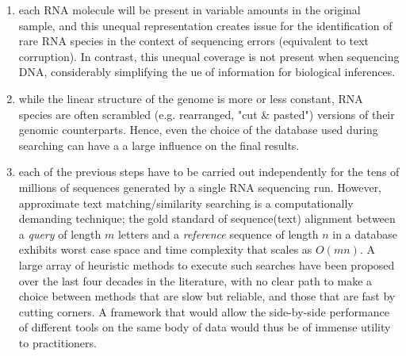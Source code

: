 \documentclass[10pt]{article}
\begin{document}
\begin{enumerate}
\item each RNA molecule will be present in variable amounts in the original sample, and this unequal representation creates issue for the identification of rare RNA species in the context of sequencing errors (equivalent to text corruption). In contrast, this unequal coverage is not present when sequencing DNA, considerably simplifying the ue of information for biological inferences. 
\item while the linear structure of the genome is more or less constant, RNA species are often scrambled (e.g. rearranged, "cut \& pasted") versions of their genomic counterparts. Hence, even the choice of the database used during searching can have a a large influence on the final results.
\item each of the previous steps have to be carried out independently for the tens of millions of sequences generated by a single RNA sequencing run. However, approximate text matching/similarity searching is a computationally demanding technique; the gold standard of sequence(text) alignment between a \textit{query} of length $m$ letters and a \textit{reference} sequence of length $n$ in a database exhibits worst case space and time complexity that scales as $O(mn)$. A large array of heuristic methods to execute such searches have been proposed over the last four decades in the literature\cite{song_new_2014,sahlin_effective_2021,bucher_sequence_1996,mitrophanov_statistical_2006}, with no clear path to make a choice between methods that are slow but reliable, and those that are fast by cutting corners. A framework that would allow the side-by-side performance of different tools on the same body of data would thus be of immense utility to practitioners.
\end{enumerate}
\end{document}
